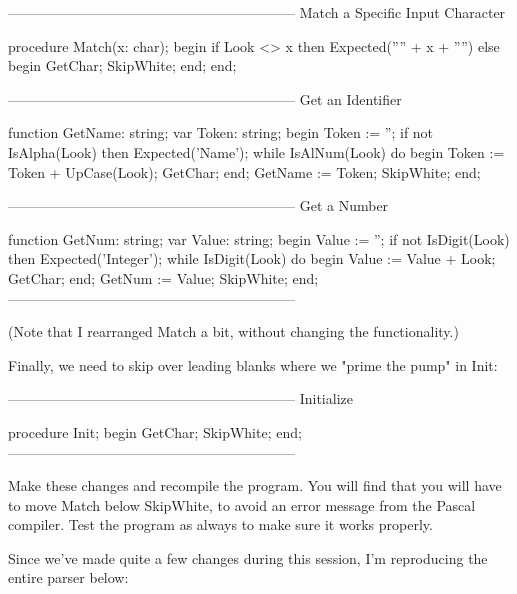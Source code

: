 \documentclass[float=false, crop=false]{standalone}
\begin{document}
\begin{code}
{--------------------------------------------------------------}
{ Match a Specific Input Character }

procedure Match(x: char);
begin
   if Look <> x then Expected('''' + x + '''')
   else begin
      GetChar;
      SkipWhite;
   end;
end;


{--------------------------------------------------------------}
{ Get an Identifier }

function GetName: string;
var Token: string;
begin
   Token := '';
   if not IsAlpha(Look) then Expected('Name');
   while IsAlNum(Look) do begin
      Token := Token + UpCase(Look);
      GetChar;
   end;
   GetName := Token;
   SkipWhite;
end;


{--------------------------------------------------------------}
{ Get a Number }

function GetNum: string;
var Value: string;
begin
   Value := '';
   if not IsDigit(Look) then Expected('Integer');
   while IsDigit(Look) do begin
      Value := Value + Look;
      GetChar;
   end;
   GetNum := Value;
   SkipWhite;
end;
{--------------------------------------------------------------}

(Note  that  I  rearranged  Match  a  bit,  without changing  the
functionality.)

Finally, we need to skip over leading blanks where we  "prime the
pump" in Init:

{--------------------------------------------------------------}
{ Initialize }

procedure Init;
begin
   GetChar;
   SkipWhite;
end;
{--------------------------------------------------------------}
\end{code}

Make these changes and recompile the program. You will find that you will have
to move Match below SkipWhite, to avoid an error message from the Pascal
compiler. Test the program as always to make sure it works properly.

Since we've made quite a few changes during this session, I'm reproducing the
entire parser below:
\end{document}

